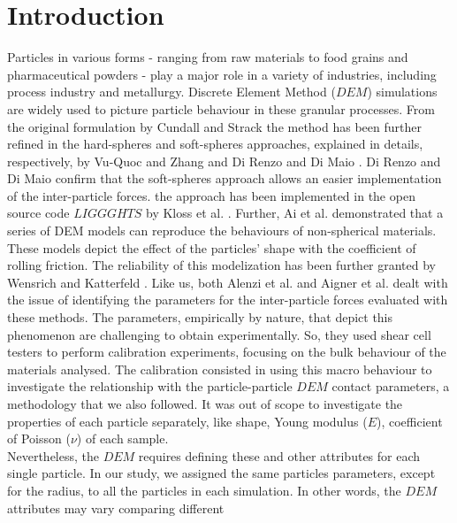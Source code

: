 \section{Introduction}
\label{sec:introduction}

Particles in various forms - ranging from raw materials to food grains and pharmaceutical powders - 
play a major role in a variety of industries, including process industry and metallurgy. 
Discrete Element Method ($DEM$) simulations are widely used to picture particle
behaviour in these granular processes.
From the original formulation by Cundall and Strack \cite{RefWorks:172}
the method has been further refined in the hard-spheres and soft-spheres
approaches, explained in details, respectively, by Vu-Quoc and Zhang
\cite{RefWorks:148} and Di Renzo and Di Maio \cite{RefWorks:145}.
Di Renzo and Di Maio \cite{RefWorks:145} confirm that the soft-spheres approach
allows an easier implementation of the inter-particle forces.
the approach has been implemented in the open source code $LIGGGHTS$ by
Kloss et al. \cite{RefWorks:136}.
Further, Ai et al. \cite{RefWorks:131} demonstrated that a series of DEM
models can reproduce the behaviours of non-spherical materials.
These models depict the effect of the particles' shape with the coefficient
of rolling friction.
The reliability of this modelization has been further granted by Wensrich and 
Katterfeld \cite{RefWorks:87}.
Like us, both Alenzi et al. \cite{RefWorks:91} and Aigner et al.
\cite{RefWorks:139} dealt with the issue of identifying the parameters for the
inter-particle forces evaluated with these methods.
The parameters, empirically by nature, that depict this phenomenon are challenging
to obtain experimentally.
So, they used shear cell testers to perform calibration experiments, 
focusing on the bulk behaviour of the materials analysed.
The calibration consisted in using this macro behaviour to 
investigate the relationship with the particle-particle $DEM$
contact parameters, a methodology that we also followed.
It was out of scope to investigate the properties of each
particle separately, like shape, Young modulus ($E$), coefficient of Poisson ($\nu$) of each sample.\\
Nevertheless, the $DEM$ requires defining these and other attributes for each
single particle.
In our study, we assigned the same particles parameters, except for the radius, to all the 
particles in each simulation. 
In other words, the $DEM$ attributes may vary comparing different 
